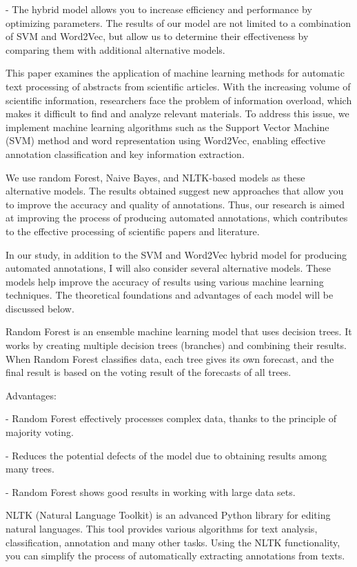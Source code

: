 - The hybrid model allows you to increase efficiency and performance by
optimizing parameters. The results of our model are not limited to a
combination of SVM and Word2Vec, but allow us to determine their
effectiveness by comparing them with additional alternative models.

This paper examines the application of machine learning methods for
automatic text processing of abstracts from scientific articles. With
the increasing volume of scientific information, researchers face the
problem of information overload, which makes it difficult to find and
analyze relevant materials. To address this issue, we implement machine
learning algorithms such as the Support Vector Machine (SVM) method and
word representation using Word2Vec, enabling effective annotation
classification and key information extraction.

We use random Forest, Naive Bayes, and NLTK-based models as these
alternative models. The results obtained suggest new approaches that
allow you to improve the accuracy and quality of annotations. Thus, our
research is aimed at improving the process of producing automated
annotations, which contributes to the effective processing of scientific
papers and literature.

In our study, in addition to the SVM and Word2Vec hybrid model for
producing automated annotations, I will also consider several
alternative models. These models help improve the accuracy of results
using various machine learning techniques. The theoretical foundations
and advantages of each model will be discussed below.

Random Forest is an ensemble machine learning model that uses decision
trees. It works by creating multiple decision trees (branches) and
combining their results. When Random Forest classifies data, each tree
gives its own forecast, and the final result is based on the voting
result of the forecasts of all trees.

Advantages:

- Random Forest effectively processes complex data, thanks to the
principle of majority voting.

- Reduces the potential defects of the model due to obtaining results
among many trees.

- Random Forest shows good results in working with large data sets.

NLTK (Natural Language Toolkit) is an advanced Python library for
editing natural languages. This tool provides various algorithms for
text analysis, classification, annotation and many other tasks. Using
the NLTK functionality, you can simplify the process of automatically
extracting annotations from texts.

